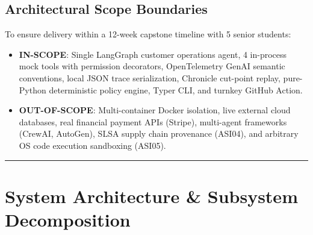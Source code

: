 \documentclass[10pt,a4paper]{article}
\begin{document}
\subsection{Architectural Scope Boundaries}
To ensure delivery within a 12-week capstone timeline with 5 senior students:
\begin{itemize}[leftmargin=1.5em,noitemsep]
    \item \textbf{IN-SCOPE}: Single LangGraph customer operations agent, 4 in-process mock tools with permission decorators, OpenTelemetry GenAI semantic conventions, local JSON trace serialization, Chronicle cut-point replay, pure-Python deterministic policy engine, Typer CLI, and turnkey GitHub Action.
    \item \textbf{OUT-OF-SCOPE}: Multi-container Docker isolation, live external cloud databases, real financial payment APIs (Stripe), multi-agent frameworks (CrewAI, AutoGen), SLSA supply chain provenance (ASI04), and arbitrary OS code execution sandboxing (ASI05).
\end{itemize}

\vspace{0.6em}
\hrule
\vspace{0.6em}

\section{System Architecture \& Subsystem Decomposition}
\end{document}
